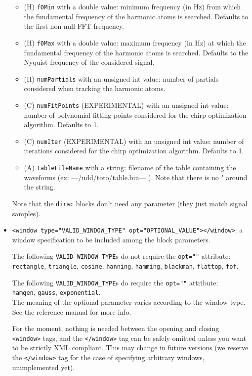 \documentclass[11pt,a4paper]{article}
\begin{document}
\begin{itemize}
\begin{itemize}
  \item (H) \verb+f0Min+ with a double value: minimum frequency (in Hz) from
    which the fundamental frequency of the harmonic atoms is searched. Defaults
    to the first non-null FFT frequency.
    
  \item (H) \verb+f0Max+ with a double value: maximum frequency (in Hz) at
    which the fundamental frequency of the harmonic atoms is searched.
    Defaults to the Nyquist frequency of the considered signal.
    
  \item (H) \verb+numPartials+ with an unsigned int value: number of partials
    considered when tracking the harmonic atoms.
    
  \item (C) \verb+numFitPoints+ (EXPERIMENTAL) with an unsigned int value:
    number of polynomial fitting points considered for the chirp optimization
    algorithm. Defaults to 1.
    
  \item (C) \verb+numIter+ (EXPERIMENTAL) with an unsigned int value: number of
    iterations considered for the chirp optimization algorithm. Defaults to 1.
    
  \item (A) \verb+tableFileName+ with a string: filename of the table
    containing the waveforms (ex: ---/udd/toto/table.bin--- ). Note that there
    is no {"} around the string.

  \end{itemize}
  Note that the \verb+dirac+ blocks don't need any parameter (they just match
  signal samples).
 
\item \verb+<window type="VALID_WINDOW_TYPE" opt="OPTIONAL_VALUE"></window>+: a
  window specification to be included among the block parameters.
  
  The following \verb+VALID_WINDOW_TYPE+s do not require the \verb+opt=""+
  attribute: \\ \verb+rectangle+, \verb+triangle+, \verb+cosine+, \verb+hanning+,
  \verb+hamming+, \verb+blackman+, \verb+flattop+, \verb+fof+.
  
  The following \verb+VALID_WINDOW_TYPE+s do require the \verb+opt=""+
  attribute: \\ \verb+hamgen+, \verb+gauss+, \verb+exponential+. \\
  The meaning of the optional parameter varies according to the window type.
  See the reference manual for more info.
  
  For the moment, nothing is needed between the opening and closing
  \verb+<window>+ tags, and the \verb+</window>+ tag can be safely omitted
  unless you want to be strictly XML compliant. This may change in future
  versions (we reserve the \verb+</window>+ tag for the case of specifying
  arbitrary windows, unimplemented yet).

\end{itemize}
\end{document}
